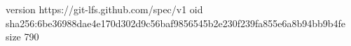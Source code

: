 version https://git-lfs.github.com/spec/v1
oid sha256:6be36988dae4e170d302d9c56baf9856545b2e230f239fa855e6a8b94bb9b4fe
size 790
